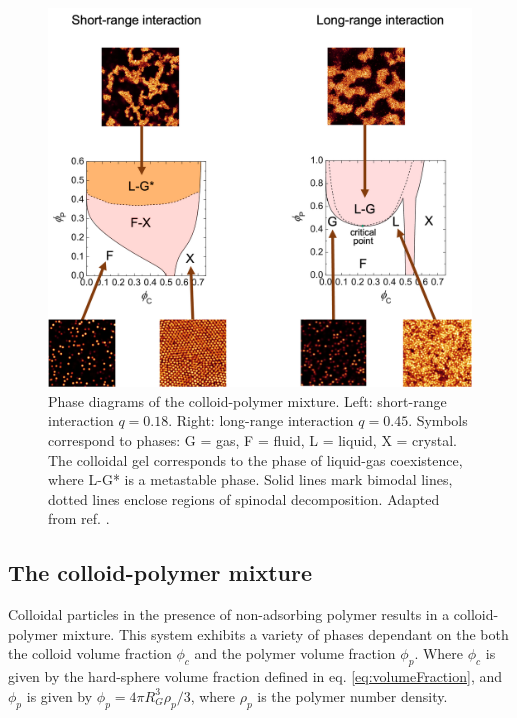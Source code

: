 \begin{figure}
	\includegraphics[width=\linewidth]{chapters/colloids/figsColloids/figGel_PD.png}
	\caption[Phase diagrams of the colloid-polymer mixture]{Phase diagrams of the colloid-polymer mixture. Left: short-range interaction $q = 0.18$. Right: long-range interaction $q=0.45$. Symbols correspond to phases: G = gas, F = fluid, L = liquid, X = crystal. The colloidal gel corresponds to the phase of liquid-gas coexistence, where L-G* is a metastable phase. Solid lines mark bimodal lines, dotted lines enclose regions of spinodal decomposition. Adapted from ref. \cite{ivlev2012}.}
	\label{fig:Gel_PD}
\end{figure}



\subsection{The colloid-polymer mixture}
\label{section:colloidPolymerMixture}

Colloidal particles in the presence of non-adsorbing polymer results in a colloid-polymer mixture. This system exhibits a variety of phases dependant on the both the colloid volume fraction $\phi_c$ and the polymer volume fraction $\phi_p$. Where $\phi_c$ is given by the hard-sphere volume fraction defined in eq. \ref{eq:volumeFraction}, and $\phi_p$ is given by $\phi_p = 4\pi R_{G}^{3} \rho_p / 3$, where $\rho_p$ is the polymer number density. 


